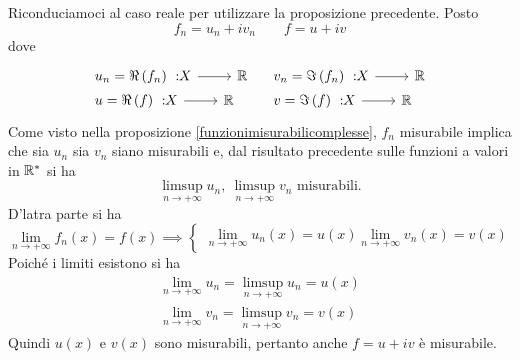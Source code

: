 \begin{demonstration}
	Riconduciamoci al caso reale per utilizzare la proposizione precedente. Posto
	\begin{equation*}
		f_n=u_n+iv_n\qquad f=u+iv
	\end{equation*}
dove
\begin{equation*}
	\begin{array}{ll}
		\funz{u_n=\Re\left(f_n\right)}{X}{\realset}&\funz{v_n=\Im\left(f_n\right)}{X}{\realset}\\
		\funz{u=\Re\left(f\right)}{X}{\realset}&\funz{v=\Im\left(f\right)}{X}{\realset}
	\end{array}
\end{equation*}
Come visto nella proposizione \ref{funzionimisurabilicomplesse}, $f_n$ misurabile implica che sia $u_n$ sia $v_n$ siano misurabili e, dal risultato precedente sulle funzioni a valori in $\mathbb{R}^{\ast}$ si ha
\begin{equation*}
	\limsup_{n\to+\infty}u_n,\ \limsup_{n\to+\infty}v_n\text{ misurabili.}
\end{equation*}
D'latra parte si ha
\begin{equation*}
	\lim_{n\to+\infty}f_n\left(x\right)=f\left(x\right)\implies
	\begin{cases}
		\lim_{n\to+\infty}u_n\left(x\right)=u\left(x\right)
		\lim_{n\to+\infty}v_n\left(x\right)=v\left(x\right)
	\end{cases}
\end{equation*}
Poiché i limiti esistono si ha
\begin{gather*}
	\lim_{n\to+\infty}u_n=\limsup_{n\to+\infty}u_n=u\left(x\right)\\	\lim_{n\to+\infty}v_n=\limsup_{n\to+\infty}v_n=v\left(x\right)
\end{gather*}
Quindi $u\left(x\right)$ e $v\left(x\right)$ sono misurabili, pertanto anche $f=u+iv$ è misurabile.
\end{demonstration}
